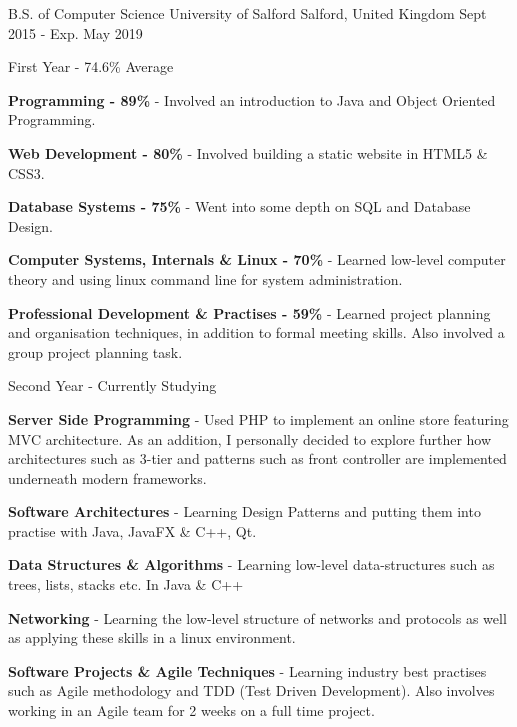 
\begin{cventries}
      \cventry
        {B.S. of Computer Science}
        {University of Salford}
        {Salford, United Kingdom}
        {Sept 2015 - Exp. May 2019}
        {}
\end{cventries}
\begin{cventries}
      \cventry
        {First Year - 74.6\% Average}
        {}
        {}
        {}
        {
          \begin{cvitems} %
            \item {\textbf{Programming - 89\%} - Involved an introduction to Java and Object Oriented Programming.}
            \item {\textbf{Web Development - 80\%} - Involved building a static website in HTML5 \& CSS3.}
            \item {\textbf{Database Systems - 75\%} - Went into some depth on SQL and Database Design.}
            \item {\textbf{Computer Systems, Internals \& Linux - 70\%} - Learned low-level computer theory and using linux command line for system administration.}
            \item {\textbf{Professional Development \& Practises - 59\%} - Learned project planning and organisation techniques, in addition to formal meeting skills. Also involved a group project planning task.}
          \end{cvitems}
        }
\end{cventries}
\begin{cventries}
      \cventry
        {Second Year - Currently Studying}
        {}
        {}
        {}
        {
          \begin{cvitems} %
            \item {\textbf{Server Side Programming} - Used PHP to implement an online store featuring MVC architecture. As an addition, I personally decided to explore further how architectures such as 3-tier and patterns such as front controller are implemented underneath modern frameworks.}
            \item {\textbf{Software Architectures} - Learning Design Patterns and putting them into practise with Java, JavaFX \& C++, Qt.}
            \item {\textbf{Data Structures \& Algorithms} - Learning low-level data-structures such as trees, lists, stacks etc. In Java \& C++}
            \item {\textbf{Networking} - Learning the low-level structure of networks and protocols as well as applying these skills in a linux environment.}
            \item {\textbf{Software Projects \& Agile Techniques} - Learning industry best practises such as Agile methodology and TDD (Test Driven Development). Also involves working in an Agile team for 2 weeks on a full time project.}
          \end{cvitems}
        }
\end{cventries}
